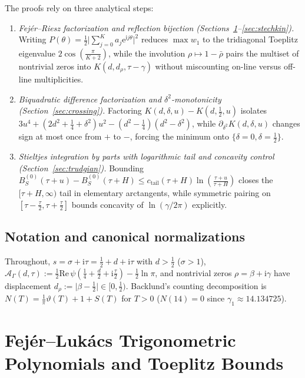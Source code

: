 \documentclass[11pt,reqno]{amsart}
\theoremstyle{definition}
\theoremstyle{remark}
\numberwithin{equation}{section}
\newcommand{\ii}{\mathrm{i}}
\newcommand{\ee}{\mathrm{e}}
\newcommand{\Rea}{\mathrm{Re}}
\begin{document}
The proofs rely on three analytical steps:
\begin{enumerate}[label=\textup{(\arabic*)},leftmargin=2.2em]
\item \textit{Fej\'er--Riesz factorization and reflection bijection (Sections~\ref{sec:fejer}--\ref{sec:stechkin}).} Writing $P(\theta) = \frac{1}{2}\lvert\sum_{j=0}^K a_j\ee^{\ii j\theta}\rvert^2$ reduces $\max w_1$ to the tridiagonal Toeplitz eigenvalue $2\cos(\frac{\pi}{K+2})$, while the involution $\rho \mapsto 1 - \bar{\rho}$ pairs the multiset of nontrivial zeros into $K(d, d_\rho, \tau - \gamma)$ without miscounting on-line versus off-line multiplicities.
\item {\sloppy\textit{Biquadratic difference factorization and $\delta^2$-monotonicity (Section~\ref{sec:crossing}).} Factoring $K(d,\delta,u) - K(d,\frac{1}{2},u)$ isolates $3u^4 + (2d^2 + \frac{1}{4} + \delta^2)u^2 - (d^2 - \frac{1}{4})(d^2 - \delta^2)$, while $\partial_{\delta^2}K(d,\delta,u)$ changes sign at most once from $+$ to $-$, forcing the minimum onto $\{\delta = 0, \delta = \frac{1}{2}\}$.\par}
\item \textit{Stieltjes integration by parts with logarithmic tail and concavity control (Section~\ref{sec:trudgian}).} Bounding $B_S^{(0)}(\tau + u) - B_S^{(0)}(\tau + H) \le c_{\mathrm{tail}}(\tau+H)\ln(\frac{\tau+u}{\tau+H})$ closes the $[\tau+H, \infty)$ tail in elementary arctangents, while symmetric pairing on $[\tau - \frac{\tau}{2}, \tau + \frac{\tau}{2}]$ bounds concavity of $\ln(\gamma/2\pi)$ explicitly.
\end{enumerate}

\subsection{Notation and canonical normalizations}\label{subsec:notation}

Throughout, $s = \sigma + \ii\tau = \frac{1}{2} + d + \ii\tau$ with $d > \frac{1}{2}$ ($\sigma > 1$), $\mathcal{A}_\Gamma(d,\tau) := \frac{1}{2}\Rea\,\psi(\frac{1}{4} + \frac{d}{2} + \ii\frac{\tau}{2}) - \frac{1}{2}\ln\pi$, and nontrivial zeros $\rho = \beta + \ii\gamma$ have displacement $d_\rho := \lvert\beta - \frac{1}{2}\rvert \in [0, \frac{1}{2})$. Backlund's counting decomposition is $N(T) = \frac{1}{\pi}\vartheta(T) + 1 + S(T)$ for $T > 0$ ($N(14) = 0$ since $\gamma_1 \approx 14.134725$).

\section{Fej\'er--Luk\'acs Trigonometric Polynomials and Toeplitz Bounds}\label{sec:fejer}
\end{document}
